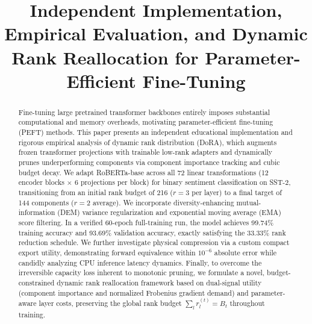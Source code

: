 \documentclass[conference]{IEEEtran}
\begin{document}
\title{Independent Implementation, Empirical Evaluation, and Dynamic Rank Reallocation for Parameter-Efficient Fine-Tuning}

\author{%
}

\maketitle

\begin{abstract}
Fine-tuning large pretrained transformer backbones entirely imposes substantial computational and memory overheads, motivating parameter-efficient fine-tuning (PEFT) methods. This paper presents an independent educational implementation and rigorous empirical analysis of dynamic rank distribution (DoRA), which augments frozen transformer projections with trainable low-rank adapters and dynamically prunes underperforming components via component importance tracking and cubic budget decay. We adapt RoBERTa-base across all 72 linear transformations (12 encoder blocks $\times$ 6 projections per block) for binary sentiment classification on SST-2, transitioning from an initial rank budget of 216 ($r=3$ per layer) to a final target of 144 components ($r=2$ average). We incorporate diversity-enhancing mutual-information (DEM) variance regularization and exponential moving average (EMA) score filtering. In a verified 60-epoch full-training run, the model achieves 99.74\% training accuracy and 93.69\% validation accuracy, exactly satisfying the 33.33\% rank reduction schedule. We further investigate physical compression via a custom compact export utility, demonstrating forward equivalence within $10^{-6}$ absolute error while candidly analyzing CPU inference latency dynamics. Finally, to overcome the irreversible capacity loss inherent to monotonic pruning, we formulate a novel, budget-constrained dynamic rank reallocation framework based on dual-signal utility (component importance and normalized Frobenius gradient demand) and parameter-aware layer costs, preserving the global rank budget $\sum_l r_l^{(t)} = B_t$ throughout training.
\end{abstract}
\end{document}
